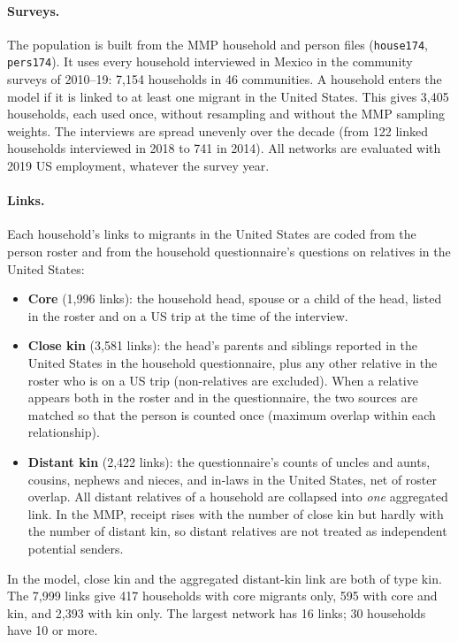 \documentclass[11pt]{article}
\begin{document}
\paragraph{Surveys.} The population is built from the MMP household and person files (\texttt{house174}, \texttt{pers174}). It uses every household interviewed in Mexico in the community surveys of 2010--19: 7,154 households in 46 communities. A household enters the model if it is linked to at least one migrant in the United States. This gives 3,405 households, each used once, without resampling and without the MMP sampling weights. The interviews are spread unevenly over the decade (from 122 linked households interviewed in 2018 to 741 in 2014). All networks are evaluated with 2019 US employment, whatever the survey year.

\paragraph{Links.} Each household's links to migrants in the United States are coded from the person roster and from the household questionnaire's questions on relatives in the United States:
\begin{itemize}[leftmargin=*]
\item \textbf{Core} (1,996 links): the household head, spouse or a child of the head, listed in the roster and on a US trip at the time of the interview.
\item \textbf{Close kin} (3,581 links): the head's parents and siblings reported in the United States in the household questionnaire, plus any other relative in the roster who is on a US trip (non-relatives are excluded). When a relative appears both in the roster and in the questionnaire, the two sources are matched so that the person is counted once (maximum overlap within each relationship).
\item \textbf{Distant kin} (2,422 links): the questionnaire's counts of uncles and aunts, cousins, nephews and nieces, and in-laws in the United States, net of roster overlap. All distant relatives of a household are collapsed into \emph{one} aggregated link. In the MMP, receipt rises with the number of close kin but hardly with the number of distant kin, so distant relatives are not treated as independent potential senders.
\end{itemize}
In the model, close kin and the aggregated distant-kin link are both of type kin. The 7,999 links give 417 households with core migrants only, 595 with core and kin, and 2,393 with kin only. The largest network has 16 links; 30 households have 10 or more.
\end{document}
